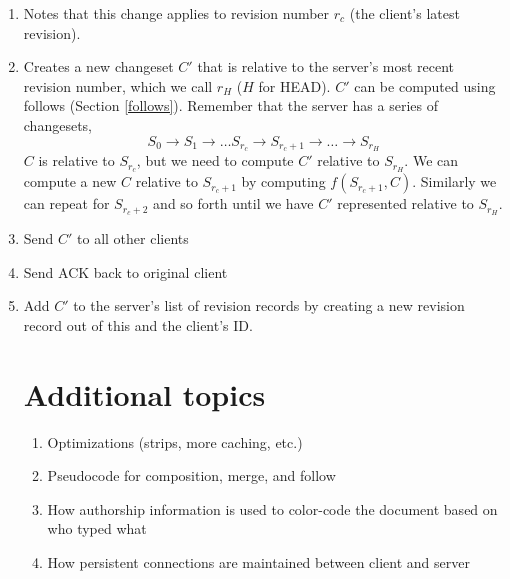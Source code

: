 \documentclass{article}
\begin{document}
\begin{enumerate}
\item Notes that this change applies to revision number
  $r_c$ (the client's latest revision).
\item Creates a new changeset $C'$ that is relative to the
  server's most recent revision number, which we call
  $r_H$ ($H$ for HEAD).  $C'$ can be computed using
  follows (Section \ref{follows}).  Remember that the server has a series of
  changesets, 
$$S_0\rightarrow S_1\rightarrow \ldots S_{r_c}\rightarrow S_{r_c+1} \rightarrow \ldots \rightarrow S_{r_H} $$
$C$ is relative to $S_{r_c}$, but we need to compute $C'$ relative to $S_{r_H}$.
We can compute a new $C$ relative to $S_{r_c+1}$ by computing $f(S_{r_c+1},C)$.  Similarly we can repeat for
$S_{r_c+2}$ and so forth until we have $C'$ represented relative to $S_{r_H}$.
\item Send $C'$ to all other clients
\item Send ACK back to original client
\item Add $C'$ to the server's list of revision records by creating a new revision record out of this and the client's ID.

\appendix

\section*{Additional topics}
\begin{enumerate}
\item Optimizations (strips, more caching, etc.)
\item Pseudocode for composition, merge, and follow
\item How authorship information is used to color-code the document based on who typed what
\item How persistent connections are maintained between client and server
\end{enumerate}
\end{enumerate}
\end{document}
